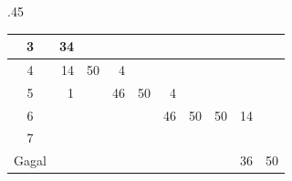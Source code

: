 \begin{landscape}
\begin{table}
\begin{subtable}{.45\linewidth}
\begin{tabular}{|c|lllllllll|}
			3                                                                         & \multicolumn{1}{r|}{34} & \multicolumn{1}{r|}{}   & \multicolumn{1}{r|}{}   & \multicolumn{1}{r|}{}   & \multicolumn{1}{r|}{}   & \multicolumn{1}{r|}{}   & \multicolumn{1}{r|}{}   & \multicolumn{1}{r|}{}   &                         \\ \hline
			4                                                                         & \multicolumn{1}{r|}{14} & \multicolumn{1}{r|}{50} & \multicolumn{1}{r|}{4}  & \multicolumn{1}{r|}{}   & \multicolumn{1}{r|}{}   & \multicolumn{1}{r|}{}   & \multicolumn{1}{r|}{}   & \multicolumn{1}{r|}{}   &                         \\ \hline
			5                                                                         & \multicolumn{1}{r|}{1}  & \multicolumn{1}{r|}{}   & \multicolumn{1}{r|}{46} & \multicolumn{1}{r|}{50} & \multicolumn{1}{r|}{4}  & \multicolumn{1}{r|}{}   & \multicolumn{1}{r|}{}   & \multicolumn{1}{r|}{}   &                         \\ \hline
			6                                                                         & \multicolumn{1}{r|}{}   & \multicolumn{1}{r|}{}   & \multicolumn{1}{r|}{}   & \multicolumn{1}{r|}{}   & \multicolumn{1}{r|}{46} & \multicolumn{1}{r|}{50} & \multicolumn{1}{r|}{50} & \multicolumn{1}{r|}{14} &                         \\ \hline
			7                                                                         & \multicolumn{1}{r|}{}   & \multicolumn{1}{r|}{}   & \multicolumn{1}{r|}{}   & \multicolumn{1}{r|}{}   & \multicolumn{1}{r|}{}   & \multicolumn{1}{r|}{}   & \multicolumn{1}{r|}{}   & \multicolumn{1}{r|}{}   &                         \\ \hline
			Gagal                                                                     & \multicolumn{1}{r|}{}   & \multicolumn{1}{r|}{}   & \multicolumn{1}{r|}{}   & \multicolumn{1}{r|}{}   & \multicolumn{1}{r|}{}   & \multicolumn{1}{r|}{}   & \multicolumn{1}{r|}{}   & \multicolumn{1}{r|}{36} & 50                      \\ \hline
			\end{tabular}
		\end{subtable}

		\vspace{1em}


\end{table}
\end{landscape}
